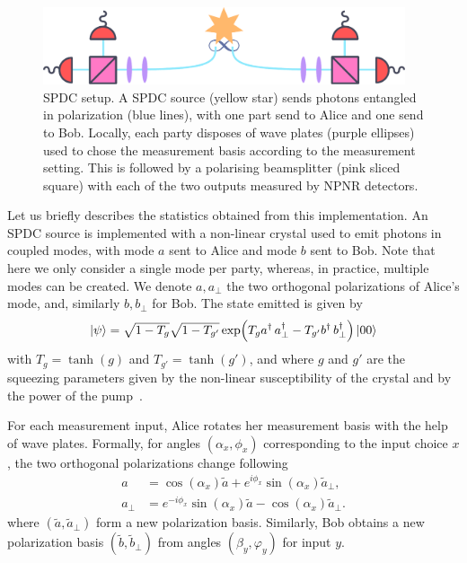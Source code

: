 \begin{figure}[t]
	\begin{center}
		\includegraphics[width=0.95\textwidth]{chapters/deviceindependent/img/spdc.pdf}
	\end{center}
	\caption{SPDC setup. A SPDC source (yellow star) sends photons entangled in polarization (blue lines), with one part send to Alice and one send to Bob.
	Locally, each party disposes of wave plates (purple ellipses) used to chose the measurement basis according to the measurement setting. This is followed by a polarising beamsplitter (pink sliced square) with each of the two outputs measured by NPNR detectors.}
	\label{fig:spdc}
\end{figure}

\medbreak

Let us briefly describes the statistics obtained from this implementation.
An SPDC source is implemented with a non-linear crystal used to emit photons in coupled modes, with mode $a$ sent to Alice and mode $b$ sent to Bob.
Note that here we only consider a single mode per party, whereas, in practice, multiple modes can be created.
We denote $a,a_\perp$ the two orthogonal polarizations of Alice's mode, and, similarly $b,b_\perp$ for Bob.
The state emitted is given by
\begin{equation}
	\ket{\psi} = \sqrt{1-T_g}\sqrt{1-T_{g'}}\exp(T_{g} a^\dag\,a^\dag_\perp - T_{g'}b^\dag\,b_\perp^\dag)\ket{00}
\end{equation}
with $T_g = \tanh(g)$ and $T_{g'} = \tanh(g')$, and where $g$ and $g'$ are the squeezing parameters given by the non-linear susceptibility of the crystal and by the power of the pump~\cite{Vivoli2015b}.

For each measurement input, Alice rotates her measurement basis with the help of wave plates.
Formally, for angles $(\alpha_x,\phi_x)$ corresponding to the input choice $x$, the two orthogonal polarizations change following
\begin{equation}
	\begin{split}
		a &= \cos(\alpha_x)\tilde{a} + e^{i\phi_x}\sin(\alpha_x)\tilde{a}_\perp, \\
		a_\perp &= e^{-i\phi_x}\sin(\alpha_x)\tilde{a}-\cos(\alpha_x)\tilde{a}_\perp.
	\end{split}
\end{equation}
where $(\tilde{a},\tilde{a}_\perp)$ form a new polarization basis.
Similarly, Bob obtains a new polarization basis $(\tilde{b},\tilde{b}_\perp)$ from angles $(\beta_y,\varphi_y)$ for input $y$.

